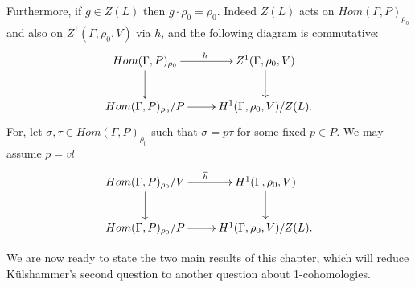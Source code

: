 Furthermore, if $g\in Z(L)$ then $g\cdot\rho_0 = \rho_0$. Indeed $Z(L)$ acts on $Hom(\Gamma, P)_{\rho_0}$ and also on $Z^1(\Gamma, \rho_0, V)$ via $h$, and the following diagram is commutative:
\begin{displaymath}
	\xymatrix{
		Hom(\Gamma, P)_{\rho_0} \ar[r]^{h} \ar[d] & Z^1(\Gamma, \rho_0, V) \ar[d] \\
		Hom(\Gamma, P)_{\rho_0}/P \ar[r] & H^1(\Gamma, \rho_0, V)/Z(L).
	}
\end{displaymath}
For, let $\sigma,\tau\in Hom(\Gamma, P)_{\rho_0}$ such that $\sigma = p\dot\tau$ for some fixed $p\in P$. We may assume $p = vl$
	\begin{displaymath}
		\xymatrix{
			Hom(\Gamma, P)_{\rho_0}/V \ar[r]^{\overline{h}} \ar[d] & H^1(\Gamma, \rho_0, V) \ar[d] \\
			Hom(\Gamma, P)_{\rho_0}/P \ar[r] & H^1(\Gamma, \rho_0, V)/Z(L).
		}
	\end{displaymath}

We are now ready to state the two main results of this chapter, which will reduce K\"ulshammer's second question to another question about 1-cohomologies.

